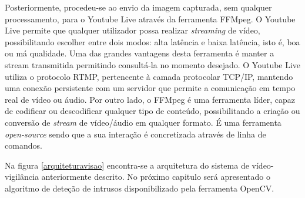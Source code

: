 Posteriormente, procedeu-se ao envio da imagem capturada, sem qualquer processamento, para o Youtube Live através da ferramenta FFMpeg. O Youtube Live permite que qualquer utilizador possa realizar \textit{streaming} de vídeo, possibilitando escolher entre dois modos: alta latência e baixa latência, isto é, boa ou má qualidade. Uma das grandes vantagens desta ferramenta é manter a stream transmitida permitindo consultá-la no momento desejado. O Youtube Live utiliza o protocolo \ac{RTMP}, pertencente à camada protocolar TCP/IP, mantendo uma conexão persistente com um servidor que permite a comunicação em tempo real de vídeo ou áudio. Por outro lado, o FFMpeg é uma ferramenta líder, capaz de codificar ou descodificar qualquer tipo de conteúdo, possibilitando a criação ou conversão de \textit{stream} de vídeo/áudio em qualquer formato. É uma ferramenta \textit{open-source} sendo que a sua interação é concretizada através de linha de comandos\cite{FFmpeg2015}. 




Na figura \ref{arquiteturavisao} encontra-se a arquitetura do sistema de vídeo-vigilância anteriormente descrito. No próximo capitulo será apresentado o algoritmo de deteção de intrusos disponibilizado pela ferramenta OpenCV. 









